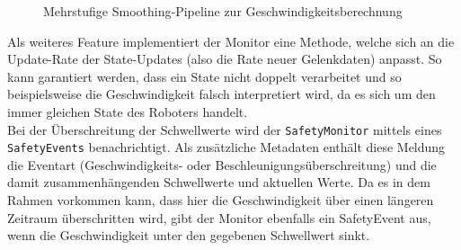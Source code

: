 \begin{figure}[H]
  \inputminted[fontsize=\footnotesize]{csharp}{code-snippets/SmoothVelocities.cs}
  \caption{Mehrstufige Smoothing-Pipeline zur Geschwindigkeitsberechnung}
  \label{listing:smoothing_pipeline}
\end{figure}

Als weiteres Feature implementiert der Monitor eine Methode, welche sich an die
Update-Rate der State-Updates (also die Rate neuer Gelenkdaten) anpasst. So kann
garantiert werden, dass ein State nicht doppelt verarbeitet und so
beispielsweise die Geschwindigkeit falsch interpretiert wird, da es sich um den
immer gleichen State des Roboters handelt.\\

Bei der Überschreitung der Schwellwerte wird der \texttt{SafetyMonitor}
mittels eines \texttt{SafetyEvents} benachrichtigt. Als zusätzliche
Metadaten enthält
diese Meldung die Eventart (Geschwindigkeits- oder
Beschleunigungsüberschreitung) und die damit zusammenhängenden Schwellwerte und
aktuellen Werte. Da es in dem Rahmen vorkommen kann, dass hier die
Geschwindigkeit über einen längeren Zeitraum überschritten wird, gibt der
Monitor ebenfalls ein SafetyEvent aus, wenn die Geschwindigkeit unter den
gegebenen Schwellwert sinkt.
